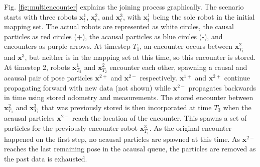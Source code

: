 Fig. \ref{fig:multiencounter} explains the joining process graphically. The scenario starts with three robots $\textbf{x}_t^1$, $\textbf{x}_t^2$, and $\textbf{x}_t^3$, with $\textbf{x}_t^1$ being the sole robot in the initial mapping set. The actual robots are represented as white circles, the causal particles as red circles (+), the acausal particles as blue circles (-), and encounters as purple arrows. At timestep $T_1$, an encounter occurs between $\textbf{x}_{T_1}^2$ and $\textbf{x}^3$, but neither is in the mapping set at this time, so this encounter is stored. At timestep 2, robots $\textbf{x}_{T_2}^1$ and $\textbf{x}_{T_2}^2$ encounter each other, spawning a causal and acausal pair of pose particles $\textbf{x}^{2+}$ and $\textbf{x}^{2-}$ respectively. $\textbf{x}^{1+}$ and $\textbf{x}^{2+}$ continue propagating forward with new data (not shown) while $\textbf{x}^{2-}$ propagates backwards in time using stored odometry and measurements. The stored encounter between $\textbf{x}_{T_1}^2$ and $\textbf{x}_{T_1}^3$ that was previously stored is then incorporated at time $T_3$ when the acausal particles $\textbf{x}^{2-}$ reach the location of the encounter. This spawns a set of particles for the previously encounter robot $\textbf{x}_{T_1}^3$. As the original encounter happened on the first step, no acausal particles are spawned at this time. As $\textbf{x}^{2-}$ reaches the last remaining pose in the acausal queue, the particles are removed as the past data is exhausted.


